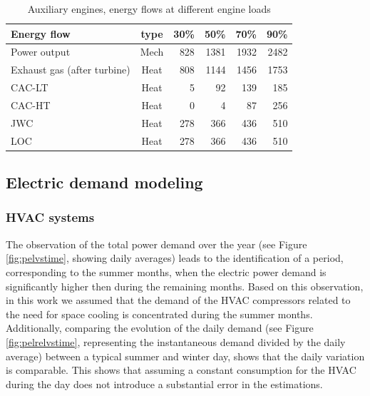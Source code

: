 \documentclass[preprint,12pt]{elsarticle}
\begin{document}
\begin{table}
	\small
	\centering
	\begin{tabular}{lcrrrr}
		\toprule
		Energy flow & type & 30\% & 50\% & 70\% & 90\% \\
		\midrule
		Power output & Mech & 828 & 1381 & 1932 & 2482 \\
		Exhaust gas (after turbine) & Heat & 808 & 1144 & 1456 & 1753 \\
		CAC-LT & Heat & 5 & 92 & 139 & 185 \\
		CAC-HT & Heat & 0 & 4 & 87 & 256  \\
		JWC & Heat & 278 & 366 & 436 & 510 \\ 
		LOC & Heat & 278 & 366 & 436 & 510 \\ 
		\bottomrule
	\end{tabular}
	\caption{Auxiliary engines, energy flows at different engine loads}
	\label{tab:AE_flows}
\end{table}

\clearpage

\subsection{Electric demand modeling} \label{sec:app:met:electric}

\subsubsection{HVAC systems}

The observation of the total power demand over the year (see Figure \ref{fig:pelvstime}, showing daily averages) leads to the identification of a  period, corresponding to the summer months, when the electric power demand is significantly higher then during the remaining months. Based on this observation, in this work we assumed that the demand of the HVAC compressors related to the need for space cooling is concentrated during the summer months. Additionally, comparing the evolution of the daily demand (see Figure \ref{fig:pelrelvstime}, representing the instantaneous demand divided by the daily average) between a typical summer and winter day, shows that the daily variation is comparable. This shows that assuming a constant consumption for the HVAC during the day does not introduce a substantial error in the estimations.
\end{document}
